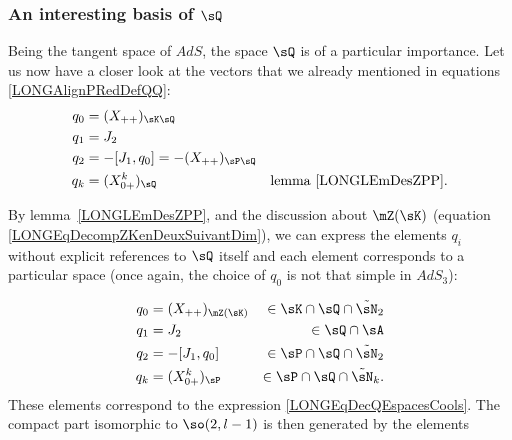 %
\subsubsection{An interesting basis of \texorpdfstring{$\sQ$}{Q}}
%
\label{LONGSubSubSecInterestingBasisQ}

Being the tangent space of $AdS$, the space $\sQ$ is of a particular importance. Let us now have a closer look at the vectors that we already mentioned in equations \eqref{LONGAlignPRedDefQQ}:
\begin{subequations}				\label{LONGEqBasQQzi}
	\begin{align}
		q_0 & =(X_{++})_{\sK\sQ}                                                 \\
		q_1 & =J_2                                                               \\
		q_2 & =-[J_1,q_0]=-(X_{++})_{\sP\sQ}                                     \\
		q_k & =(X^k_{0+})_{\sQ}              & \text{lemma~\ref{LONGLEmDesZPP}}.
	\end{align}
\end{subequations}

By lemma~\ref{LONGLEmDesZPP}, and the discussion about $\mZ(\sK)$ (equation \eqref{LONGEqDecompZKenDeuxSuivantDim}), we can express the elements $q_i$ without explicit references to $\sQ$ itself and each element corresponds to a particular space (once again, the choice of $q_0$ is not that simple in $AdS_3$):

%
\begin{subequations}		\label{LONGEqBasQQziPlusMieux}%
	\begin{align}
		q_0 & =(X_{++})_{\mZ(\sK)} & \in \sK\cap\sQ\cap\tilde\sN_2                           \\
		q_1 & =J_2                 & \in\sQ\cap\sA                                           \\
		q_2 & =-[J_1,q_0]          & \in\sP\cap\sQ\cap\tilde\sN_2	\label{LONGsubEqJUnQZQDeux} \\
		q_k & =(X^k_{0+})_{\sP}    & \in\sP\cap\sQ\cap\tilde\sN_k.
	\end{align}
\end{subequations}
These elements correspond to the expression \eqref{LONGEqDecQEspacesCools}.
%
The compact part isomorphic to $\so(2,l-1)$ is then generated by the elements%

